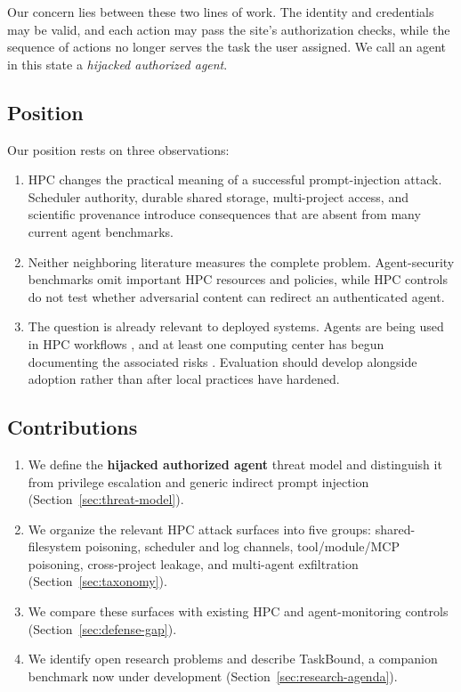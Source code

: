 Our concern lies between these two lines of work. The identity and credentials may be valid, and each action may pass the site's authorization checks, while the sequence of actions no longer serves the task the user assigned. We call an agent in this state a \emph{hijacked authorized agent}.

\subsection{Position}
\label{sec:thesis}

Our position rests on three observations:

\begin{enumerate}[leftmargin=*]
  \item HPC changes the practical meaning of a successful prompt-injection attack. Scheduler authority, durable shared storage, multi-project access, and scientific provenance introduce consequences that are absent from many current agent benchmarks.
  \item Neither neighboring literature measures the complete problem. Agent-security benchmarks omit important HPC resources and policies, while HPC controls do not test whether adversarial content can redirect an authenticated agent.
  \item The question is already relevant to deployed systems. Agents are being used in HPC workflows \cite{Ma2025HPCAgent,Rosendo2025ORNL,Mondesire2025PEARC}, and at least one computing center has begun documenting the associated risks \cite{AaltoSciComp2026}. Evaluation should develop alongside adoption rather than after local practices have hardened.
\end{enumerate}

\subsection{Contributions}
\label{sec:contributions}

\begin{enumerate}[leftmargin=*]
  \item We define the \textbf{hijacked authorized agent} threat model and distinguish it from privilege escalation and generic indirect prompt injection (Section~\ref{sec:threat-model}).
  \item We organize the relevant HPC attack surfaces into five groups: shared-filesystem poisoning, scheduler and log channels, tool/module/MCP poisoning, cross-project leakage, and multi-agent exfiltration (Section~\ref{sec:taxonomy}).
  \item We compare these surfaces with existing HPC and agent-monitoring controls (Section~\ref{sec:defense-gap}).
  \item We identify open research problems and describe TaskBound, a companion benchmark now under development (Section~\ref{sec:research-agenda}).
\end{enumerate}

